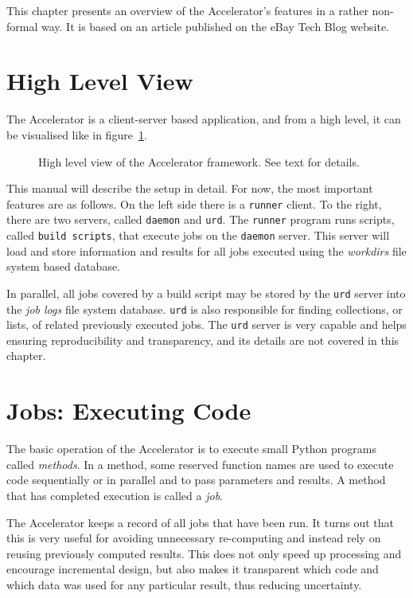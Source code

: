 
This chapter presents an overview of the Accelerator's features in a
rather non-formal way.  It is based on an article published on the
eBay Tech Blog website.



\section{High Level View}

The Accelerator is a client-server based application, and from a high
level, it can be visualised like in figure~\ref{fig:overview}.
\begin{figure}[h!]
  \begin{center}
    
    \caption{High level view of the Accelerator framework.  See text
      for details.}
    \label{fig:overview}
  \end{center}
\end{figure}
This manual will describe the setup in detail.  For now, the most
important features are as follows.  On the left side there is a
\texttt{runner} client.  To the right, there are two servers, called
\texttt{daemon} and \texttt{urd}.  The \texttt{runner} program runs
scripts, called \texttt{build scripts}, that execute jobs on the
\texttt{daemon} server.  This server will load and store information
and results for all jobs executed using the \textsl{workdirs} file
system based database.

In parallel, all jobs covered by a build script may be stored by
the \texttt{urd} server into the \textsl{job logs} file system
database.  \texttt{urd} is also responsible for finding collections,
or lists, of related previously executed jobs.  The \texttt{urd}
server is very capable and helps ensuring reproducibility and
transparency, and its details are not covered in this chapter.


\section{Jobs:  Executing Code}
The basic operation of the Accelerator is to execute small Python
programs called \textsl{methods}.  In a method, some reserved function
names are used to execute code sequentially or in parallel and to pass
parameters and results.  A method that has completed execution is
called a \textsl{job}.

The Accelerator keeps a record of all jobs that have been run.  It
turns out that this is very useful for avoiding unnecessary
re-computing and instead rely on reusing previously computed results.
This does not only speed up processing and encourage incremental
design, but also makes it transparent which code and which data was
used for any particular result, thus reducing uncertainty.

